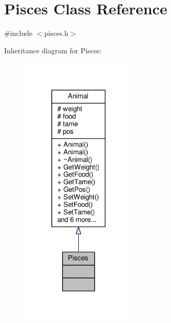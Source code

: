 \hypertarget{classPisces}{}\section{Pisces Class Reference}
\label{classPisces}


{\ttfamily \#include $<$pisces.\+h$>$}



Inheritance diagram for Pisces\+:
\nopagebreak
\begin{figure}[H]
\begin{center}
\leavevmode
\includegraphics[width=158pt]{classPisces__inherit__graph}
\end{center}
\end{figure}


